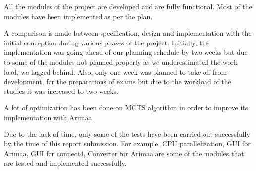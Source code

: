 All the modules of the project are developed and are fully functional. Most of the modules have been implemented as per the plan.

A comparison is made between specification, design and implementation with the initial conception during various phases of the project.
Initially, the implementation was going ahead of our planning schedule by two weeks but due to some of the modules not planned properly as we underestimated the work load, we lagged behind. Also, only one week was planned to take off from development, for the preparations of exams but due to the workload of the studies it was increased to two weeks.

A lot of optimization has been done on MCTS algorithm in order to improve its implementation with Arimaa. 

Due to the lack of time, only some of the tests have been carried out successfully by the time of this report submission. For example, CPU parallelization, GUI for Arimaa, GUI for connect4, Converter for Arimaa are some of the modules that are tested and implemented successfully.